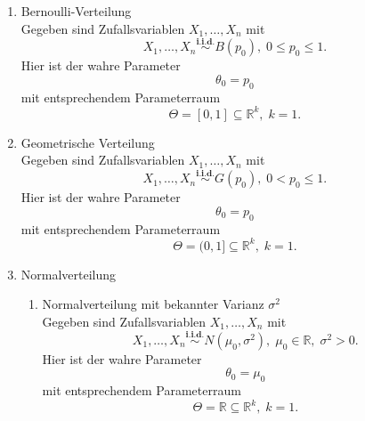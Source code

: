 \documentclass[10pt]{article}
\newcommand{\FZV}{X_1, \ldots, X_n} %
\newcommand{\IR}{\mathbb{R}} %
\begin{document}
	\begin{enumerate}[label = (\roman*)]
		\item Bernoulli-Verteilung \\
		Gegeben sind Zufallsvariablen $\FZV$ mit
		\begin{equation*}
			\FZV \overset{\textbf{i.i.d.}}{\sim} B(p_0), \; 0 \leq p_0 \leq 1.
		\end{equation*} 
		Hier ist der wahre Parameter 
		\begin{equation*}
			\theta_0 = p_0
		\end{equation*}
		mit entsprechendem Parameterraum
		\begin{equation*}
			\Theta = [0,1] \subseteq \IR^k,\; k=1.
		\end{equation*}
		
		\item Geometrische Verteilung \\
		Gegeben sind Zufallsvariablen $\FZV$ mit
		\begin{equation*}
			\FZV \overset{\textbf{i.i.d.}}{\sim} G(p_0), \; 0 < p_0 \leq 1.
		\end{equation*} 
		Hier ist der wahre Parameter 
		\begin{equation*}
			\theta_0 = p_0
		\end{equation*}
		mit entsprechendem Parameterraum
		\begin{equation*}
			\Theta = (0,1] \subseteq \IR^k,\; k=1.
		\end{equation*}


	\item Normalverteilung
	\begin{enumerate}[label = (\alph*)] %
	\item Normalverteilung mit bekannter Varianz $\sigma^2$\\
	Gegeben sind Zufallsvariablen $\FZV$ mit
	\begin{equation*}
		\FZV \overset{\textbf{i.i.d.}} {\sim} N(\mu_0,\sigma^2),\; \mu_0 \in \IR, \; \sigma^2 >0.
	\end{equation*} 
	Hier ist der wahre Parameter 
	\begin{equation*}
		\theta_0 = \mu_0
	\end{equation*}
	mit entsprechendem Parameterraum
	\begin{equation*}
		\Theta = \IR \subseteq \IR^k,\; k=1.
	\end{equation*}
	

\end{enumerate}
\end{enumerate}
\end{document}

